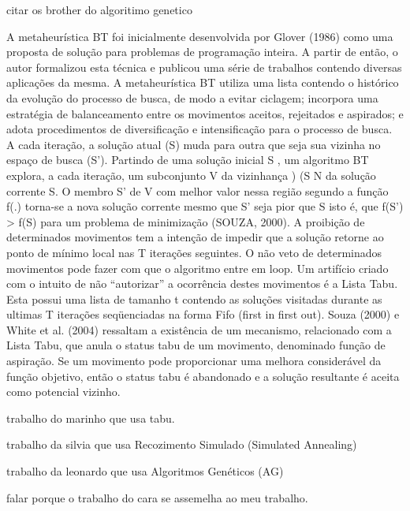 \documentclass{abntpuc}
\begin{document}

citar os brother do algoritimo genetico


	\cite{glover}

	A metaheurística BT foi inicialmente desenvolvida por Glover (1986) como uma proposta de
	solução para problemas de programação inteira. A partir de então, o autor formalizou esta
	técnica e publicou uma série de trabalhos contendo diversas aplicações da mesma. A
	metaheurística BT utiliza uma lista contendo o histórico da evolução do processo de busca, de
	modo a evitar ciclagem; incorpora uma estratégia de balanceamento entre os movimentos
	aceitos, rejeitados e aspirados; e adota procedimentos de diversificação e intensificação para o
	processo de busca. A cada iteração, a solução atual (S) muda para outra que seja sua vizinha no espaço de busca
	(S’). Partindo de uma solução inicial
		S , um algoritmo BT explora, a cada iteração, um
	subconjunto V da vizinhança  ) (S N da solução corrente S. O membro S’ de V com melhor
	valor nessa região segundo a função f(.) torna-se a nova solução corrente mesmo que S’ seja
	pior que S isto é, que f(S’) > f(S) para um problema de minimização (SOUZA, 2000).
	A proibição de determinados movimentos tem a intenção de impedir que a solução retorne ao
	ponto de mínimo local nas T iterações seguintes. O não veto de determinados movimentos
	pode fazer com que o algoritmo entre em loop. Um artifício criado com o intuito de não
	“autorizar” a ocorrência destes movimentos é a Lista Tabu. Esta possui uma lista de tamanho t
	contendo as soluções visitadas durante as ultimas T iterações seqüenciadas na forma Fifo (first
	in first out).
	Souza (2000) e White et al. (2004) ressaltam a existência de um mecanismo, relacionado com
	a Lista Tabu, que anula o status tabu de um movimento, denominado função de aspiração. Se
	um movimento pode proporcionar uma melhora considerável da função objetivo, então o
	status tabu é abandonado e a solução resultante é aceita como potencial vizinho.

	



trabalho do marinho que usa tabu.

trabalho da silvia que usa Recozimento Simulado (Simulated Annealing)

trabalho da leonardo que usa Algoritmos Genéticos (AG)

falar porque o trabalho do cara se assemelha ao meu trabalho.









\end{document}
